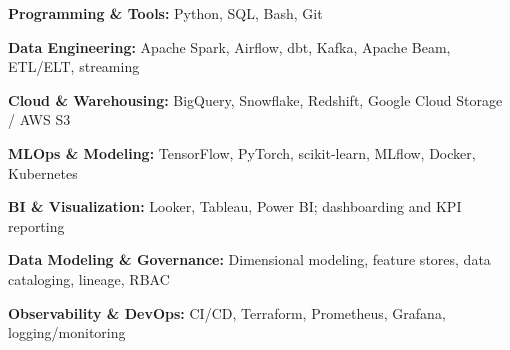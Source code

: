 \begin{itemize}[noitemsep, left=0pt]
    \item \small{\textbf{Programming \& Tools:} Python, SQL, Bash, Git}
    \item \small{\textbf{Data Engineering:} Apache Spark, Airflow, dbt, Kafka, Apache Beam, ETL/ELT, streaming
    \item \textbf{Cloud \& Warehousing:} BigQuery, Snowflake, Redshift, Google Cloud Storage / AWS S3}
    \item \small{\textbf{MLOps \& Modeling:} TensorFlow, PyTorch, scikit-learn, MLflow, Docker, Kubernetes}
    \item \small{\textbf{BI \& Visualization:} Looker, Tableau, Power BI; dashboarding and KPI reporting}
    \item \small{\textbf{Data Modeling \& Governance:} Dimensional modeling, feature stores, data cataloging, lineage, RBAC}
    \item \small{\textbf{Observability \& DevOps:} CI/CD, Terraform, Prometheus, Grafana, logging/monitoring}
\end{itemize}
\vspace{-13pt}